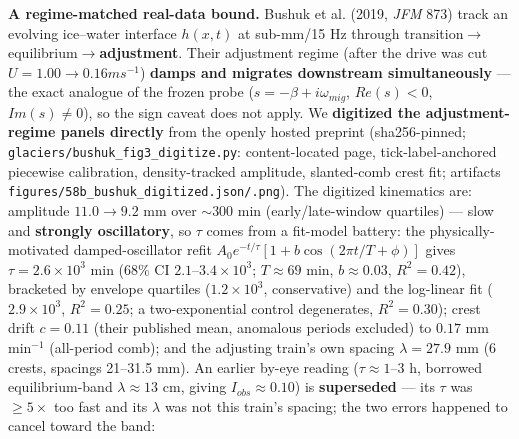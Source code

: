 \documentclass{jfm}
\newcommand{\code}[1]{\texttt{#1}}
\begin{document}
\textbf{A regime-matched real-data bound.} Bushuk et al. (2019, \emph{JFM} 873) track an evolving ice–water interface $h(x,t)$ at sub-mm/15 Hz through transition\ensuremath{\to}equilibrium\ensuremath{\to}\textbf{adjustment}. Their adjustment regime (after the drive was cut $U=1.00\to 0.16 m s^{-1}$) \textbf{damps and migrates downstream simultaneously} — the exact analogue of the frozen probe ($s=-\beta +i\omega _{mig}$, $Re(s)<0$, $Im(s)\ne 0$), so the sign caveat does not apply. We \textbf{digitized the adjustment-regime panels directly} from the openly hosted preprint (sha256-pinned; \code{glaciers/\allowbreak{}bushuk\_\allowbreak{}fig3\_\allowbreak{}digitize.py}: content-located page, tick-label-anchored piecewise calibration, density-tracked amplitude, slanted-comb crest fit; artifacts \code{figures/\allowbreak{}58b\_\allowbreak{}bushuk\_\allowbreak{}digitized.\allowbreak{}json/.png}). The digitized kinematics are: amplitude $11.0\to 9.2$ mm over $\sim 300$ min (early/late-window quartiles) — slow and \textbf{strongly oscillatory}, so $\tau $ comes from a fit-model battery: the physically-motivated damped-oscillator refit $A_{0}e^{-t/\tau }[1+b\cos (2\pi t/T+\phi )]$ gives $\tau =2.6\times 10^{3}$ min (68\% CI $2.1$–$3.4\times 10^{3}$; $T\approx 69$ min, $b\approx 0.03$, $R^{2}=0.42$), bracketed by envelope quartiles ($1.2\times 10^{3}$, conservative) and the log-linear fit ($2.9\times 10^{3}$, $R^{2}=0.25$; a two-exponential control degenerates, $R^{2}=0.30$); crest drift $c=0.11$ (their published mean, anomalous periods excluded) to $0.17$ mm min$^{-1}$ (all-period comb); and the adjusting train's own spacing $\lambda =27.9$ mm (6 crests, spacings 21–31.5 mm). An earlier by-eye reading ($\tau \approx 1–3$ h, borrowed equilibrium-band $\lambda \approx 13$ cm, giving $I_{obs}\approx 0.10$) is \textbf{superseded} — its $\tau $ was $\ge 5\times $ too fast and its $\lambda $ was not this train's spacing; the two errors happened to cancel toward the band:
\end{document}
